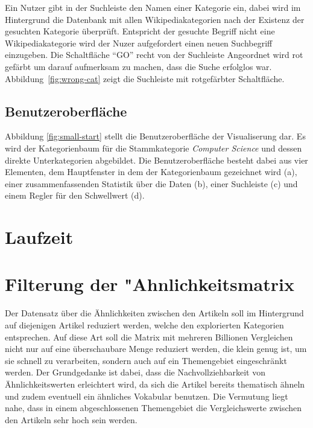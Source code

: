 
Ein Nutzer gibt in der Suchleiste den Namen einer Kategorie ein, dabei wird im Hintergrund die Datenbank mit allen Wikipediakategorien nach der Existenz der gesuchten Kategorie überprüft.
Entspricht der gesuchte Begriff nicht eine Wikipediakategorie wird der Nuzer aufgefordert einen neuen Suchbegriff einzugeben.
Die Schaltfläche "`GO"' recht von der Suchleiste Angeordnet wird rot gefärbt um darauf aufmerksam zu machen, dass die Suche erfolglos war. 
Abbildung~\ref{fig:wrong-cat} zeigt die Suchleiste mit rotgefärbter Schaltfläche.


\subsection{Benutzeroberfläche}
Abbildung \ref{fig:small-start} stellt die Benutzeroberfläche der Visualiserung dar.
Es wird der Kategorienbaum für die Stammkategorie \emph{Computer Science} und dessen direkte Unterkategorien abgebildet.
Die Benutzeroberfläche besteht dabei aus vier Elementen, dem Hauptfenster in dem der Kategorienbaum gezeichnet wird (a), einer zusammenfassenden Statistik über die Daten (b), einer Suchleiste (c) und einem Regler für den Schwellwert (d). 



\section{Laufzeit}
\section{Filterung der "Ahnlichkeitsmatrix}





Der Datensatz über die Ähnlichkeiten zwischen den Artikeln soll im Hintergrund auf diejenigen Artikel reduziert werden, welche den explorierten Kategorien entsprechen.
Auf diese Art soll die Matrix mit mehreren Billionen Vergleichen nicht nur auf eine überschaubare Menge reduziert werden, die klein genug ist, um sie schnell zu verarbeiten, sondern auch auf ein Themengebiet eingeschränkt werden.
Der Grundgedanke ist dabei, dass die Nachvollziehbarkeit von Ähnlichkeitswerten erleichtert wird, da sich die Artikel bereits thematisch ähneln und zudem eventuell ein ähnliches Vokabular benutzen.
Die Vermutung liegt nahe, dass in einem abgeschlossenen Themengebiet die Vergleichswerte zwischen den Artikeln sehr hoch sein werden.


